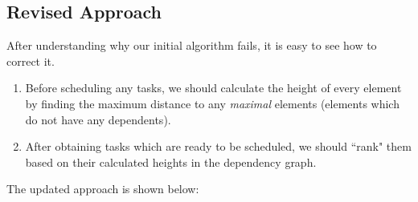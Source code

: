 \documentclass{article}
\begin{document}
\subsection*{Revised Approach}
    After understanding why our initial algorithm fails, it is easy to see how to correct it.
    \begin{enumerate}[label = \arabic*.]
        \item Before scheduling any tasks, we should calculate the height of every element by finding the maximum distance to any \textit{maximal} elements (elements which do not have any dependents).
        \item After obtaining tasks which are ready to be scheduled, we should ``rank" them based on their calculated heights in the dependency graph.
    \end{enumerate}
    The updated approach is shown below:
\end{document}
